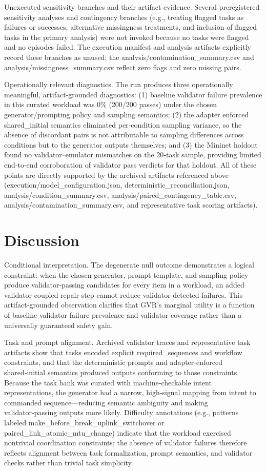 \documentclass[conference]{IEEEtran}
\begin{document}
Unexecuted sensitivity branches and their artifact evidence. Several preregistered sensitivity analyses and contingency branches (e.g., treating flagged tasks as failures or successes, alternative missingness treatments, and inclusion of flagged tasks in the primary analysis) were not invoked because no tasks were flagged and no episodes failed. The execution manifest and analysis artifacts explicitly record these branches as unused; the analysis/contamination\_summary.csv and analysis/missingness\_summary.csv reflect zero flags and zero missing pairs.

Operationally relevant diagnostics. The run produces three operationally meaningful, artifact‑grounded diagnostics: (1) baseline validator failure prevalence in this curated workload was 0\% (200/200 passes) under the chosen generator/prompting policy and sampling semantics; (2) the adapter enforced shared\_initial semantics eliminated per‑condition sampling variance, so the absence of discordant pairs is not attributable to sampling differences across conditions but to the generator outputs themselves; and (3) the Mininet holdout found no validator--emulator mismatches on the 20‑task sample, providing limited end‑to‑end corroboration of validator pass verdicts for that holdout. All of these points are directly supported by the archived artifacts referenced above (execution/model\_configuration.json, deterministic\_reconciliation.json, analysis/condition\_summary.csv, analysis/paired\_contingency\_table.csv, analysis/contamination\_summary.csv, and representative task scoring artifacts).

\section{Discussion}
Conditional interpretation. The degenerate null outcome demonstrates a logical constraint: when the chosen generator, prompt template, and sampling policy produce validator‑passing candidates for every item in a workload, an added validator‑coupled repair step cannot reduce validator‑detected failures. This artifact‑grounded observation clarifies that GVR's marginal utility is a function of baseline validator failure prevalence and validator coverage rather than a universally guaranteed safety gain.

Task and prompt alignment. Archived validator traces and representative task artifacts show that tasks encoded explicit required\_sequences and workflow constraints, and that the deterministic prompts and adapter‑enforced shared‑initial semantics produced outputs conforming to those constraints. Because the task bank was curated with machine‑checkable intent representations, the generator had a narrow, high‑signal mapping from intent to commanded sequence---reducing semantic ambiguity and making validator‑passing outputs more likely. Difficulty annotations (e.g., patterns labeled make\_before\_break\_uplink\_switchover or paired\_link\_atomic\_mtu\_change) indicate that the workload exercised nontrivial coordination constraints; the absence of validator failures therefore reflects alignment between task formalization, prompt semantics, and validator checks rather than trivial task simplicity.
\end{document}
